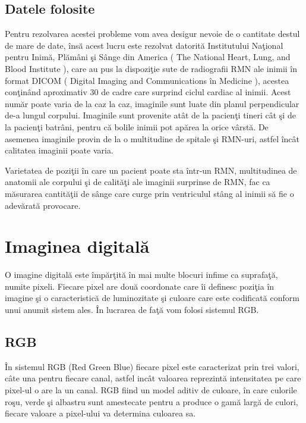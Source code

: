 \subsection{Datele folosite}

Pentru rezolvarea acestei probleme vom avea desigur nevoie de o cantitate destul de mare de date, \^{i}ns\u{a} acest lucru este rezolvat datorit\u{a} Institutului Na\c{t}ional pentru Inim\u{a}, Pl\u{a}m\^{a}ni \c{s}i S\^{a}nge din America ( The National Heart, Lung, and Blood Institute ), care au pus la dispozi\c{t}ie sute de radiografii RMN ale inimii \^{i}n format DICOM ( Digital Imaging and Communications \^{i}n Medicine ), acestea con\c{t}in\^{a}nd aproximativ 30 de cadre care surprind ciclul cardiac al inimii. Acest num\u{a}r poate varia de la caz la caz, imaginile sunt luate din planul perpendicular de-a lungul corpului. Imaginile sunt provenite at\^{a}t de la pacien\c{t}i tineri c\^{a}t \c{s}i de la pacien\c{t}i batr\^{a}ni, pentru c\u{a} bolile inimii pot ap\u{a}rea la orice v\^{a}rst\u{a}. De asemenea imaginile provin de la o multitudine de spitale \c{s}i RMN-uri, astfel \^{i}nc\^{a}t calitatea imaginii poate varia.

\par

Varietatea de pozi\c{t}ii \^{i}n care un pacient poate sta \^{i}ntr-un RMN, multitudinea de anatomii ale corpului \c{s}i de calit\u{a}\c{t}i ale imaginii surprinse de RMN, fac ca m\u{a}surarea cantit\u{a}\c{t}ii de s\^{a}nge care curge prin ventriculul st\^{a}ng al inimii s\u{a} fie o adev\u{a}rat\u{a} provocare.

\section{Imaginea digital\u{a}}

O imagine digital\u{a} este \^{i}mp\u{a}r\c{t}it\u{a} \^{i}n mai multe blocuri infime ca suprafa\c{t}\u{a}, numite pixeli. Fiecare pixel are dou\u{a} coordonate care \^{i}i definesc pozi\c{t}ia \^{i}n imagine \c{s}i o caracteristic\u{a} de luminozitate \c{s}i culoare care este codificat\u{a} conform unui anumit sistem ales. \^{I}n lucrarea de fa\c{t}\u{a} vom folosi sistemul RGB.

\subsection{RGB}

\^{I}n sistemul RGB (Red Green Blue) fiecare pixel este caracterizat prin trei valori, c\^{a}te una pentru fiecare canal, astfel inc\^{a}t valoarea reprezint\u{a} intensitatea pe care pixel-ul o are la un canal. RGB fiind un model aditiv de culoare, \^{i}n care culorile ro\c{s}u, verde \c{s}i albastru sunt amestecate pentru a produce o gam\u{a} larg\u{a} de culori, fiecare valoare a pixel-ului va determina culoarea sa.

